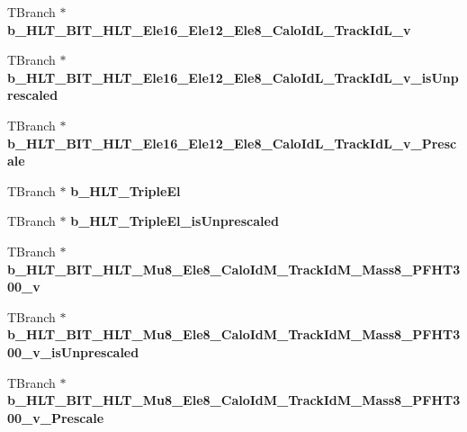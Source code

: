 \begin{DoxyCompactItemize}
\item 
\hypertarget{classMiniTree_ab6e527496d934aa8329daf426a3f738d}{}\label{classMiniTree_ab6e527496d934aa8329daf426a3f738d} 
T\+Branch $\ast$ {\bfseries b\+\_\+\+H\+L\+T\+\_\+\+B\+I\+T\+\_\+\+H\+L\+T\+\_\+\+Ele16\+\_\+\+Ele12\+\_\+\+Ele8\+\_\+\+Calo\+Id\+L\+\_\+\+Track\+Id\+L\+\_\+v}
\item 
\hypertarget{classMiniTree_a46053bf49577c1ccb3a9d99920912e7d}{}\label{classMiniTree_a46053bf49577c1ccb3a9d99920912e7d} 
T\+Branch $\ast$ {\bfseries b\+\_\+\+H\+L\+T\+\_\+\+B\+I\+T\+\_\+\+H\+L\+T\+\_\+\+Ele16\+\_\+\+Ele12\+\_\+\+Ele8\+\_\+\+Calo\+Id\+L\+\_\+\+Track\+Id\+L\+\_\+v\+\_\+is\+Unprescaled}
\item 
\hypertarget{classMiniTree_a5e8015b141db9b59954ef22a8a8d6745}{}\label{classMiniTree_a5e8015b141db9b59954ef22a8a8d6745} 
T\+Branch $\ast$ {\bfseries b\+\_\+\+H\+L\+T\+\_\+\+B\+I\+T\+\_\+\+H\+L\+T\+\_\+\+Ele16\+\_\+\+Ele12\+\_\+\+Ele8\+\_\+\+Calo\+Id\+L\+\_\+\+Track\+Id\+L\+\_\+v\+\_\+\+Prescale}
\item 
\hypertarget{classMiniTree_a481863d96a126f812fe7cab1bb2c2e6f}{}\label{classMiniTree_a481863d96a126f812fe7cab1bb2c2e6f} 
T\+Branch $\ast$ {\bfseries b\+\_\+\+H\+L\+T\+\_\+\+Triple\+El}
\item 
\hypertarget{classMiniTree_aba808e69e5439161c269647b1a65cf30}{}\label{classMiniTree_aba808e69e5439161c269647b1a65cf30} 
T\+Branch $\ast$ {\bfseries b\+\_\+\+H\+L\+T\+\_\+\+Triple\+El\+\_\+is\+Unprescaled}
\item 
\hypertarget{classMiniTree_a6a185b8e0e5794793bf4ef9c942f9fb4}{}\label{classMiniTree_a6a185b8e0e5794793bf4ef9c942f9fb4} 
T\+Branch $\ast$ {\bfseries b\+\_\+\+H\+L\+T\+\_\+\+B\+I\+T\+\_\+\+H\+L\+T\+\_\+\+Mu8\+\_\+\+Ele8\+\_\+\+Calo\+Id\+M\+\_\+\+Track\+Id\+M\+\_\+\+Mass8\+\_\+\+P\+F\+H\+T300\+\_\+v}
\item 
\hypertarget{classMiniTree_a0ef29f2ac93ab8aa7e81cc78b16d8550}{}\label{classMiniTree_a0ef29f2ac93ab8aa7e81cc78b16d8550} 
T\+Branch $\ast$ {\bfseries b\+\_\+\+H\+L\+T\+\_\+\+B\+I\+T\+\_\+\+H\+L\+T\+\_\+\+Mu8\+\_\+\+Ele8\+\_\+\+Calo\+Id\+M\+\_\+\+Track\+Id\+M\+\_\+\+Mass8\+\_\+\+P\+F\+H\+T300\+\_\+v\+\_\+is\+Unprescaled}
\item 
\hypertarget{classMiniTree_aa74f58ae438505416635fd7322899b4e}{}\label{classMiniTree_aa74f58ae438505416635fd7322899b4e} 
T\+Branch $\ast$ {\bfseries b\+\_\+\+H\+L\+T\+\_\+\+B\+I\+T\+\_\+\+H\+L\+T\+\_\+\+Mu8\+\_\+\+Ele8\+\_\+\+Calo\+Id\+M\+\_\+\+Track\+Id\+M\+\_\+\+Mass8\+\_\+\+P\+F\+H\+T300\+\_\+v\+\_\+\+Prescale}
\item 

\end{DoxyCompactItemize}
